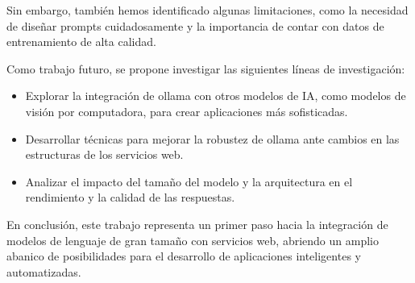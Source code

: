 \documentclass[10pt]{article}
\begin{document}
Sin embargo, también hemos identificado algunas limitaciones, como la necesidad de diseñar prompts cuidadosamente y la importancia de contar con datos de entrenamiento de alta calidad.

Como trabajo futuro, se propone investigar las siguientes líneas de investigación:

\begin{itemize}
    \item Explorar la integración de ollama con otros modelos de IA, como modelos de visión por computadora, para crear aplicaciones más sofisticadas.
    \item Desarrollar técnicas para mejorar la robustez de ollama ante cambios en las estructuras de los servicios web.
    \item Analizar el impacto del tamaño del modelo y la arquitectura en el rendimiento y la calidad de las respuestas.
\end{itemize}

En conclusión, este trabajo representa un primer paso hacia la integración de modelos de lenguaje de gran tamaño con servicios web, abriendo un amplio abanico de posibilidades para el desarrollo de aplicaciones inteligentes y automatizadas.
\end{document}
